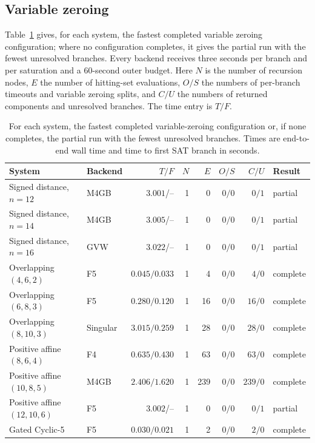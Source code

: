 \subsection{Variable zeroing}

Table~\ref{tab:appendix-zeroing} gives, for each system, the fastest
completed variable zeroing configuration; where no configuration completes, it
gives the partial run with the fewest unresolved branches.
Every backend receives three seconds per branch and per saturation and a
60-second outer budget.
Here $N$ is the number of recursion nodes,
$E$ the number of hitting-set evaluations, $O/S$ the numbers of per-branch timeouts
and variable zeroing splits, and $C/U$ the numbers of returned components and unresolved
branches.  The time entry is $T/F$.

\begin{table}[pos=htbp]
\centering
\caption{For each system, the fastest completed variable-zeroing
configuration or, if none completes, the partial run with the fewest
unresolved branches.  Times are end-to-end wall time and time to first SAT
branch in seconds.}
\label{tab:appendix-zeroing}
\small
\setlength{\tabcolsep}{4pt}
\begin{tabular}{l l r r r r r l}
\hline
System & Backend & $T/F$ & $N$ & $E$ & $O/S$ & $C/U$ & Result \\
\hline
Signed distance, $n=12$ & M4GB & $3.001$/-- & 1 & 0 & $0/0$ & $0/1$ & partial \\
Signed distance, $n=14$ & M4GB & $3.005$/-- & 1 & 0 & $0/0$ & $0/1$ & partial \\
Signed distance, $n=16$ & GVW & $3.022$/-- & 1 & 0 & $0/0$ & $0/1$ & partial \\
Overlapping $(4,6,2)$ & F5 & $0.045/0.033$ & 1 & 4 & $0/0$ & $4/0$ & complete \\
Overlapping $(6,8,3)$ & F5 & $0.280/0.120$ & 1 & 16 & $0/0$ & $16/0$ & complete \\
Overlapping $(8,10,3)$ & Singular & $3.015/0.259$ & 1 & 28 & $0/0$ & $28/0$ & complete \\
Positive affine $(8,6,4)$ & F4 & $0.635/0.430$ & 1 & 63 & $0/0$ & $63/0$ & complete \\
Positive affine $(10,8,5)$ & M4GB & $2.406/1.620$ & 1 & 239 & $0/0$ & $239/0$ & complete \\
Positive affine $(12,10,6)$ & F5 & $3.002$/-- & 1 & 0 & $0/0$ & $0/1$ & partial \\
Gated Cyclic-5 & F5 & $0.030/0.021$ & 1 & 2 & $0/0$ & $2/0$ & complete \\

\end{tabular}
\end{table}
